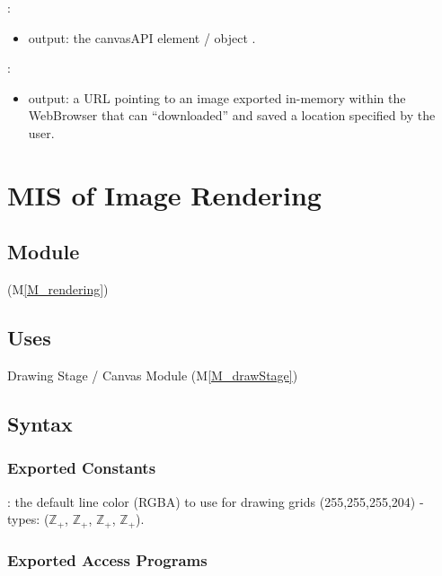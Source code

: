 \documentclass[12pt, titlepage]{article}
\newcommand{\mref}[1]{M\ref{#1}}
\newcommand{\mrefp}[1]{(\mref{#1})}
\newcommand{\mreff}[1]{Module \mrefp{#1}}
\begin{document}
\noindent {}:
\begin{itemize}
\item output: the canvasAPI element / object \cite{html_std_canvas}.
\end{itemize}

\noindent {}:
\begin{itemize}
\item output: a URL pointing to an image exported in-memory within the WebBrowser that can
  ``downloaded'' and saved a location specified by the user.
\end{itemize}

\newpage



\section{MIS of Image Rendering} \label{MS_rendering}

\subsection{Module}
 \mrefp{M_rendering}

\subsection{Uses}
Drawing Stage / Canvas \mreff{M_drawStage}

\subsection{Syntax}

\subsubsection{Exported Constants}
: the default line color (RGBA) to use for drawing grids (255,255,255,204)
 - types: ($\mathbb{Z}_+$, $\mathbb{Z}_+$, $\mathbb{Z}_+$, $\mathbb{Z}_+$).

\subsubsection{Exported Access Programs}
\end{document}
